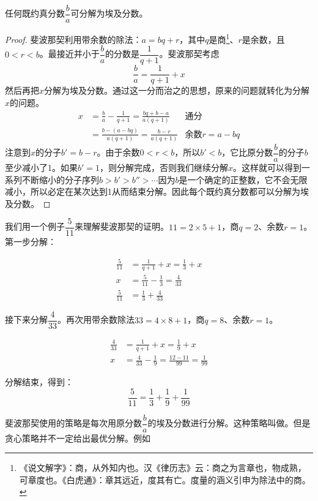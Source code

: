 \documentclass[b5paper]{ctexart}
\begin{document}
\begin{theorem}[斐波那契]
任何既约真分数$\dfrac{b}{a}$可分解为埃及分数。
\end{theorem}

\begin{proof}
斐波那契利用带余数的除法：$a = bq + r$，其中$q$是商\footnote{《说文解字》：商，从外知内也。汉《律历志》云：商之为言章也，物成熟，可章度也。《白虎通》：章其远近，度其有亡。度量的涵义引申为除法中的商。}、$r$是余数，且$0 < r < b$。最接近并小于$\dfrac{b}{a}$的分数是$\dfrac{1}{q + 1}$。斐波那契考虑
\[
  \frac{b}{a} = \frac{1}{q + 1} + x
\]
然后再把$x$分解为埃及分数。通过这一分而治之的思想，原来的问题就转化为分解$x$的问题。
\begin{align*}
  x & = \frac{b}{a} - \frac{1}{q + 1} = \frac{bq + b - a}{a(q + 1)} & \text{通分} \\
    & = \frac{b - (a - bq)}{a(q+1)} = \frac{b - r}{a(q+1)} & \text{余数}r = a - bq
\end{align*}
注意到$x$的分子$b' = b - r$。由于余数$0 < r < b$，所以$b' < b$，它比原分数$\dfrac{b}{a}$的分子$b$至少减小了1。如果$b' = 1$，则分解完成，否则我们继续分解$x$。这样就可以得到一系列不断缩小的分子序列$b > b' > b'' > \cdots$因为$b$是一个确定的正整数，它不会无限减小，所以必定在某次达到1从而结束分解。因此每个既约真分数都可以分解为埃及分数。
\end{proof}

我们用一个例子$\dfrac{5}{11}$来理解斐波那契的证明。$11 = 2 \times 5 + 1$，商$q = 2$、余数$r = 1$。第一步分解：

\begin{align*}
\frac{5}{11} & = \frac{1}{q + 1} + x = \frac{1}{3} + x  \\
 x &= \frac{5}{11} - \frac{1}{3} = \frac{4}{33} \\
\frac{5}{11} &= \frac{1}{3} + \frac{4}{33}
\end{align*}

接下来分解$\dfrac{4}{33}$。再次用带余数除法$33 = 4 \times 8 + 1$，商$q = 8$、余数$r = 1$。

\begin{align*}
\frac{4}{33} & = \frac{1}{q + 1} + x = \frac{1}{9} + x  \\
 x &= \frac{4}{33} - \frac{1}{9} = \frac{12 - 11}{99} = \frac{1}{99}
\end{align*}

分解结束，得到：
\[
\frac{5}{11} = \frac{1}{3} + \frac{1}{9} + \frac{1}{99}
\]

斐波那契使用的策略是每次用原分数$\dfrac{b}{a}$的埃及分数进行分解。这种策略叫做。但是贪心策略并不一定给出最优分解。例如
\end{document}
